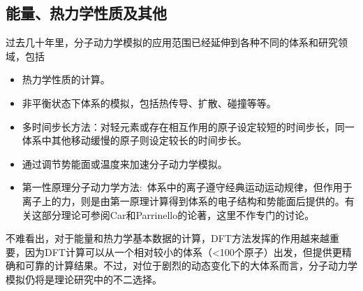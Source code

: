 \subsection{能量、热力学性质及其他}
过去几十年里，分子动力学模拟的应用范围已经延伸到各种不同的体系和研究领域，包括
\begin{itemize}
	\item 热力学性质的计算。
	\item 非平衡状态下体系的模拟\cite{CMP8-247_2005}，包括热传导、扩散、碰撞等等。
	\item 多时间步长方法：对轻元素或存在相互作用的原子设定较短的时间步长，同一体系中其他移动缓慢的原子则设定较长的时间步长。
	\item 通过调节势能面或温度来加速分子动力学模拟\cite{JCP106-4665_1997,JCP112-9599_2000}。
	\item 第一性原理分子动力学方法:~体系中的离子遵守经典运动运动规律，但作用于离子上的力，则是由第一原理计算得到体系的电子结构和势能面后提供的。有关这部分理论可参阅\textrm{Car}和\textrm{Parrinello}的论著\cite{PRL55-2471_1985}，这里不作专门的讨论。
\end{itemize}

不难看出，对于能量和热力学基本数据的计算，\textrm{DFT}方法发挥的作用越来越重要，因为\textrm{DFT}计算可以从一个相对较小的体系（<100个原子）出发，但提供更精确和可靠的计算结果。不过，对位于剧烈的动态变化下的大体系而言，分子动力学模拟仍将是理论研究中的不二选择。

